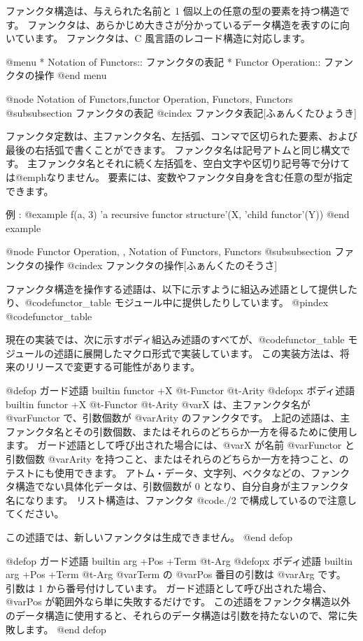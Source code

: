 {{ファンクタ構造は、与えられた名前と 1 個以上の任意の型の要素を持つ構造です。
ファンクタは、あらかじめ大きさが分かっているデータ構造を表すのに向いています。
ファンクタは、C 風言語のレコード構造に対応します。

@menu
* Notation of Functors::        ファンクタの表記
* Functor Operation::           ファンクタの操作
@end menu

@node Notation of Functors,functor Operation, Functors, Functors
@subsubsection ファンクタの表記
@cindex ファンクタ表記[ふぁんくたひょうき]

ファンクタ定数は、主ファンクタ名、左括弧、コンマで区切られた要素、および最後の右括弧で書くことができます。
ファンクタ名は記号アトムと同じ構文です。
主ファンクタ名とそれに続く左括弧を、空白文字や区切り記号等で分けては@emph{なりません}。
要素には、変数やファンクタ自身を含む任意の型が指定できます。

例 :
@example
f(a, 3)   'a recursive functor structure'(X, 'child functor'(Y))
@end example

@node Functor Operation,  , Notation of Functors, Functors
@subsubsection ファンクタの操作
@cindex ファンクタの操作[ふぁんくたのそうさ]

ファンクタ構造を操作する述語は、以下に示すように組込み述語として提供したり、@code{functor_table} モジュール中に提供したりしています。
@pindex @code{functor_table}

現在の実装では、次に示すボディ組込み述語のすべてが、@code{functor_table} モジュールの述語に展開したマクロ形式で実装しています。
この実装方法は、将来のリリースで変更する可能性があります。

@defop {ガード述語} {builtin} functor +X @t{-}Functor @t{-}Arity
@defopx {ボディ述語} {builtin} functor +X @t{-}Functor @t{-}Arity
 @var{X} は、主ファンクタ名が @var{Functor} で、引数個数が @var{Arity} のファンクタです。
上記の述語は、主ファンクタ名とその引数個数、またはそれらのどちらか一方を得るために使用します。
ガード述語として呼び出された場合には、@var{X} が名前 @var{Functor} と引数個数 @var{Arity} を持つこと、またはそれらのどちらか一方を持つこと、のテストにも使用できます。
アトム・データ、文字列、ベクタなどの、ファンクタ構造でない具体化データは、引数個数が 0 となり、自分自身が主ファンクタ名になります。
リスト構造は、ファンクタ @code{./2} で構成しているので注意してください。

この述語では、新しいファンクタは生成できません。 
@end defop

@defop {ガード述語} {builtin} arg +Pos +Term @t{-}Arg
@defopx {ボディ述語} {builtin} arg +Pos +Term @t{-}Arg
 @var{Term} の @var{Pos} 番目の引数は @var{Arg} です。
引数は 1 から番号付けしています。
ガード述語として呼び出された場合、 @var{Pos} が範囲外なら単に失敗するだけです。
この述語をファンクタ構造以外のデータ構造に使用すると、それらのデータ構造は引数を持たないので、常に失敗します。
@end defop

}}
